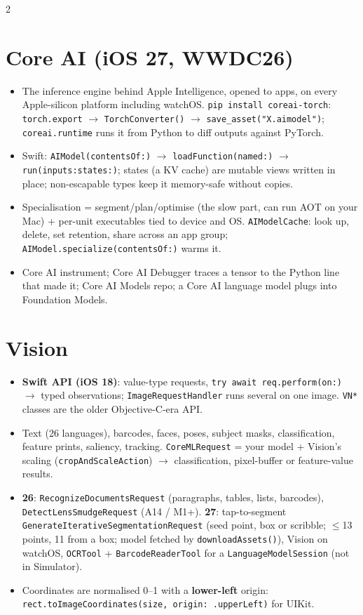 \documentclass[8pt]{extarticle}
\newcommand\ct[1]{\texttt{#1}}
\begin{document}
\begin{multicols}{2}
\section{Core AI (iOS 27, WWDC26)}
\begin{itemize}
  \item The inference engine behind Apple Intelligence, opened to apps, on every Apple-silicon
        platform including watchOS. \ct{pip install coreai-torch}: \ct{torch.export} $\to$
        \ct{TorchConverter()} $\to$ \ct{save\_asset("X.aimodel")}; \ct{coreai.runtime} runs it from
        Python to diff outputs against PyTorch.
  \item Swift: \ct{AIModel(contentsOf:)} $\to$ \ct{loadFunction(named:)} $\to$
        \ct{run(inputs:states:)}; states (a KV cache) are mutable views written in place;
        non-escapable types keep it memory-safe without copies.
  \item Specialisation = segment/plan/optimise (the slow part, can run AOT on your Mac) +
        per-unit executables tied to device and OS. \ct{AIModelCache}: look up, delete, set
        retention, share across an app group; \ct{AIModel.specialize(contentsOf:)} warms it.
  \item Core AI instrument; Core AI Debugger traces a tensor to the Python line that made it;
        Core AI Models repo; a Core AI language model plugs into Foundation Models.
\end{itemize}

\section{Vision}
\begin{itemize}
  \item \textbf{Swift API (iOS 18)}: value-type requests, \ct{try await req.perform(on:)} $\to$
        typed observations; \ct{ImageRequestHandler} runs several on one image. \ct{VN*} classes
        are the older Objective-C-era API.
  \item Text (26 languages), barcodes, faces, poses, subject masks, classification, feature
        prints, saliency, tracking. \ct{CoreMLRequest} = your model + Vision's scaling
        (\ct{cropAndScaleAction}) $\to$ classification, pixel-buffer or feature-value results.
  \item \textbf{26}: \ct{RecognizeDocumentsRequest} (paragraphs, tables, lists, barcodes),
        \ct{DetectLensSmudgeRequest} (A14 / M1+). \textbf{27}: tap-to-segment
        \ct{GenerateIterativeSegmentationRequest} (seed point, box or scribble; $\le$13 points,
        11 from a box; model fetched by \ct{downloadAssets()}), Vision on watchOS, \ct{OCRTool} +
        \ct{BarcodeReaderTool} for a \ct{LanguageModelSession} (not in Simulator).
  \item Coordinates are normalised 0–1 with a \textbf{lower-left} origin:
        \ct{rect.toImageCoordinates(size, origin: .upperLeft)} for UIKit.
\end{itemize}


\end{multicols}
\end{document}

